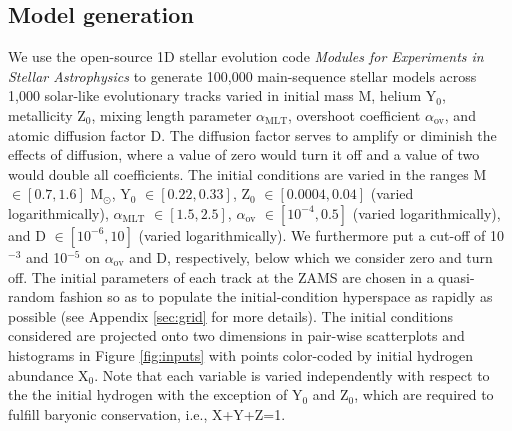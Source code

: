 \documentclass[manuscript]{aastex}
\begin{document}
\subsection{Model generation}
\label{sec:models}
We use the open-source 1D stellar evolution code \emph{Modules for Experiments in Stellar Astrophysics} \citep[MESA,][]{Paxton2011} to generate 100,000 main-sequence stellar models across 1,000 solar-like evolutionary tracks varied in initial mass M, helium Y$_0$, metallicity Z$_0$, mixing length parameter $\alpha_{\text{MLT}}$, overshoot coefficient $\alpha_{\text{ov}}$, and atomic diffusion factor D. The diffusion factor serves to amplify or diminish the effects of diffusion, where a value of zero would turn it off and a value of two would double all coefficients. The initial conditions are varied in the ranges M $\in [0.7, 1.6]$ M$_\odot$, Y$_0$ $\in [0.22, 0.33]$, Z$_0$ $\in [0.0004, 0.04]$ (varied logarithmically), $\alpha_{\text{MLT}}$ $\in [1.5, 2.5]$, $\alpha_{\text{ov}}$ $\in [10^{-4}, 0.5]$ (varied logarithmically), and D $\in [10^{-6}, 10]$ (varied logarithmically). We furthermore put a cut-off of 10$^{-3}$ and 10$^{-5}$ on $\alpha_{\text{ov}}$ and D, respectively, below which we consider zero and turn off. The initial parameters of each track at the ZAMS are chosen in a quasi-random fashion so as to populate the initial-condition hyperspace as rapidly as possible (see Appendix \ref{sec:grid} for more details). The initial conditions considered are projected onto two dimensions in pair-wise scatterplots and histograms in Figure \ref{fig:inputs} with points color-coded by initial hydrogen abundance X$_0$. Note that each variable is varied independently with respect to the the initial hydrogen with the exception of Y$_0$ and Z$_0$, which are required to fulfill baryonic conservation, i.e., X+Y+Z=1. 
\end{document}

